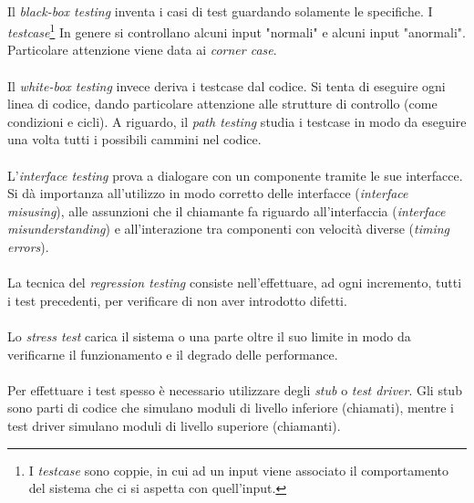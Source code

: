 \documentclass[12pt,a4paper,twoside,english,italian]{book}
\begin{document}
\paragraph{} Il \emph{black-box testing} inventa i casi di test guardando solamente le specifiche. I \emph{testcase}\footnote{I \emph{testcase} sono coppie, in cui ad un input viene associato il comportamento del sistema che ci si aspetta con quell'input.} In genere si controllano alcuni input "normali" e alcuni input "anormali". Particolare attenzione viene data ai \emph{corner case}. 

\paragraph{} Il \emph{white-box testing} invece deriva i testcase dal codice. Si tenta di eseguire ogni linea di codice, dando particolare attenzione alle strutture di controllo (come condizioni e cicli). A riguardo, il \emph{path testing} studia i testcase in modo da eseguire una volta tutti i possibili cammini nel codice. 

\paragraph{} L'\emph{interface testing} prova a dialogare con un componente tramite le sue interfacce. Si dà importanza all'utilizzo in modo corretto delle interfacce (\emph{interface misusing}), alle assunzioni che il chiamante fa riguardo all'interfaccia (\emph{interface misunderstanding}) e all'interazione tra componenti con velocità diverse (\emph{timing errors}).

\paragraph{} La tecnica del \emph{regression testing} consiste nell'effettuare, ad ogni incremento, tutti i test precedenti, per verificare di non aver introdotto difetti.

\paragraph{} Lo \emph{stress test} carica il sistema o una parte oltre il suo limite in modo da verificarne il funzionamento e il degrado delle performance.

\paragraph{} Per effettuare i test spesso è necessario utilizzare degli \emph{stub} o \emph{test driver}. Gli stub sono parti di codice che simulano moduli di livello inferiore (chiamati), mentre i test driver simulano moduli di livello superiore (chiamanti).
\end{document}
